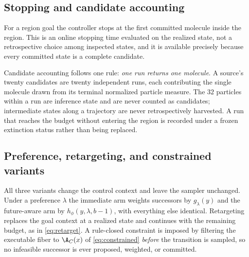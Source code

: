 \subsection{Stopping and candidate accounting}

For a region goal the controller stops at the first committed molecule inside the region. This is an online stopping time evaluated on the realized state, not a retrospective choice among inspected states, and it is available precisely because every committed state is a complete candidate.

Candidate accounting follows one rule: \emph{one run returns one molecule}. A source's twenty candidates are twenty independent runs, each contributing the single molecule drawn from its terminal normalized particle measure. The $32$ particles within a run are inference state and are never counted as candidates; intermediate states along a trajectory are never retrospectively harvested. A run that reaches the budget without entering the region is recorded under a frozen extinction status rather than being replaced.

\subsection{Preference, retargeting, and constrained variants}

All three variants change the control context and leave the sampler unchanged. Under a preference $\lambda$ the immediate arm weights successors by $g_\lambda(y)$ and the future-aware arm by $h_\phi(y,\lambda,b-1)$, with everything else identical. Retargeting replaces the goal context at a realized state and continues with the remaining budget, as in \eqref{eq:retarget}. A rule-closed constraint is imposed by filtering the executable fiber to $\A_C(x)$ of \eqref{eq:constrained} \emph{before} the transition is sampled, so no infeasible successor is ever proposed, weighted, or committed.

